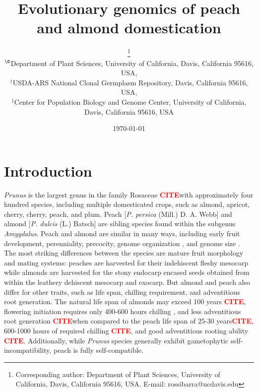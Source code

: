 \documentclass[12pt]{article}
\newcommand{\citex}{\textcolor{red}{\bf CITE}}
\begin{document}
\title{Evolutionary genomics of peach \\and almond domestication}

\author{\small{}\thanks{Corresponding author: Department of Plant Sciences, University of California, Davis, California 95616, USA. E-mail: \mbox{rossibarra@ucdavis.edu}} \\[0.3cm]
     \small\sf $^{\S}$Department of Plant Sciences, University of California, Davis, California 95616, USA,\\
     \small\sf $^{\dag}$USDA-ARS National Clonal Germplasm Repository, Davis, California 95616, USA,\\
     \small\sf $^{\ddag}$Center for Population Biology and Genome Center, University of California, Davis, California 95616, USA}

\date{\today}
\section*{Introduction}
%
\emph{Prunus} is the largest genus in the family Rosaceae \citex with approximately four hundred species, including multiple domesticated crops, such as almond, apricot, cherry, cherry, peach, and plum.
%
Peach [\emph{P. persica} (Mill.) D. A. Webb] and almond [\emph{P. dulcis} (L.) Batsch] are sibling species found within the subgenus \emph{Amygdalus}.
%
Peach and almond are similar in many ways, including early fruit development, perenniality, precocity, genome organization \citep{arus2012peach}, and genome size \citep{baird1994estimating}. 
%
The most striking differences between the species are mature fruit morphology and mating systems: peaches are harvested for their indehiscent fleshy mesocarp while almonds are harvested for the stony endocarp encased seeds obtained from within the leathery dehiscent mesocarp and exocarp. 
%
But almond and peach also differ for other traits, such as life span, chilling requirement, and adventitious root generation.
%
The natural life span of almonds may exceed 100 years \citex,
flowering initiation requires only 400-600 hours chilling \citep{alonso2005determination}, 
and less adventitious root generation \citex when compared to the peach life span of 25-30 years\citex, 
600-1000 hours of required chilling \citex, 
and good adventitious rooting ability \citex. 
%
Additionally, while \emph{Prunus} species generally exhibit gametophytic self-incompatibility, peach is fully self-compatible.
\end{document}
